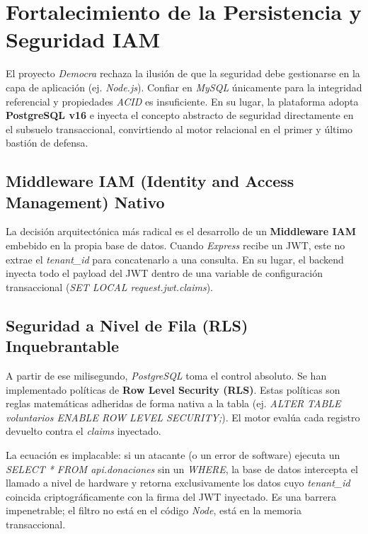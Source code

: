 \section{Fortalecimiento de la Persistencia y Seguridad IAM}

El proyecto \textit{Democra} rechaza la ilusi\'on de que la seguridad debe gestionarse en la capa de aplicaci\'on (ej. \textit{Node.js}). Confiar en \textit{MySQL} \'unicamente para la integridad referencial y propiedades \textit{ACID} es insuficiente. En su lugar, la plataforma adopta \textbf{PostgreSQL v16} e inyecta el concepto abstracto de seguridad directamente en el subsuelo transaccional, convirtiendo al motor relacional en el primer y \'ultimo basti\'on de defensa.

\subsection{Middleware IAM (Identity and Access Management) Nativo}

La decisi\'on arquitect\'onica m\'as radical es el desarrollo de un \textbf{Middleware IAM} embebido en la propia base de datos. Cuando \textit{Express} recibe un JWT, este no extrae el \textit{tenant\_id} para concatenarlo a una consulta. En su lugar, el backend inyecta todo el payload del JWT dentro de una variable de configuraci\'on transaccional (\textit{SET LOCAL request.jwt.claims}).

\subsection{Seguridad a Nivel de Fila (RLS) Inquebrantable}

A partir de ese milisegundo, \textit{PostgreSQL} toma el control absoluto. Se han implementado pol\'iticas de \textbf{Row Level Security (RLS)}. Estas pol\'iticas son reglas matem\'aticas adheridas de forma nativa a la tabla (ej. \textit{ALTER TABLE voluntarios ENABLE ROW LEVEL SECURITY;}). El motor eval\'ua cada registro devuelto contra el \textit{claims} inyectado.

La ecuaci\'on es implacable: si un atacante (o un error de software) ejecuta un \textit{SELECT * FROM api.donaciones} sin un \textit{WHERE}, la base de datos intercepta el llamado a nivel de hardware y retorna exclusivamente los datos cuyo \textit{tenant\_id} coincida criptogr\'aficamente con la firma del JWT inyectado. Es una barrera impenetrable; el filtro no est\'a en el c\'odigo \textit{Node}, est\'a en la memoria transaccional.
